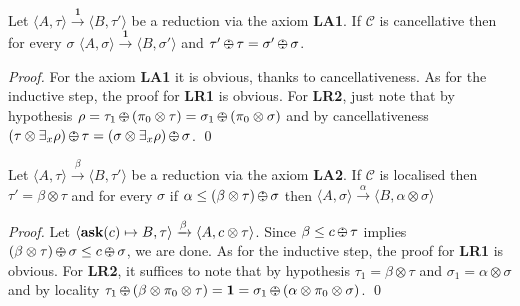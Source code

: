 \documentclass{llncs}
\def\C{{\mathcal C}}
\newcommand{\ask}{{\bf ask}}
\def\monid{{\mathbf 0}}
\def\C{{\mathcal C}}
\def\odiv{\, {\ominus\hspace{-7.7pt} \div} \,}
\def\monid{\mathbf{1}}
\begin{document}
{\begin{lemma}
	\label{LA1}
	Let $\langle A, \tau \rangle \xrightarrow{\monid} \langle B, \tau' \rangle$ be a reduction 
	via the axiom {\bf LA1}. 
	If $\C$ is cancellative then 
	for every $\sigma$
	$\langle A, \sigma \rangle \xrightarrow{\monid} \langle B, \sigma' \rangle$
	and $\tau' \odiv \tau = \sigma' \odiv \sigma$.
\end{lemma}
\begin{proof}
	For the axiom {\bf LA1} it is obvious,
	thanks to cancellativeness.
	As for the inductive step, the proof for 
	{\bf LR1} is obvious. For {\bf LR2},
	just note that by hypothesis 
	$\rho = \tau_1 \odiv (\pi_0 \otimes \tau) = \sigma_1 \odiv (\pi_0 \otimes \sigma)$
	and by cancellativeness 
	$(\tau \otimes \exists_x \rho) \odiv \tau = (\sigma \otimes \exists_x \rho) \odiv \sigma$.
	\qed
\end{proof}


\begin{lemma}
	\label{LA2}
	Let $\langle A, \tau \rangle \xrightarrow{\beta} \langle B, \tau' \rangle$ be a reduction 
	via the axiom {\bf LA2}. If $\C$ is localised then $\tau' = \beta \otimes \tau$
	and for every $\sigma$ if $\alpha \leq (\beta \otimes \tau) \odiv \sigma$ then
	$\langle A, \sigma \rangle \xrightarrow{\alpha} \langle B, \alpha \otimes \sigma \rangle$
\end{lemma}
\begin{proof}
	Let $\langle \hbox{\ask}(c) \mapsto B, \tau \rangle \xrightarrow{\beta} \langle A, c \otimes \tau \rangle$.
	Since $\beta \leq c \odiv \tau$ implies 
	$(\beta \otimes \tau)\odiv \sigma \leq c \odiv \sigma$,
	we are done.
	As for the inductive step, the proof for 
	{\bf LR1} is obvious. For {\bf LR2},
	it suffices to note that by hypothesis 
	$\tau_1 = \beta \otimes \tau$ and $\sigma_1 = \alpha \otimes \sigma$
	and by locality 
	$\tau_1 \odiv (\beta \otimes \pi_0 \otimes \tau) = \monid = \sigma_1 \odiv (\alpha \otimes \pi_0 \otimes \sigma)$.
	\qed
\end{proof}

}
\end{document}
